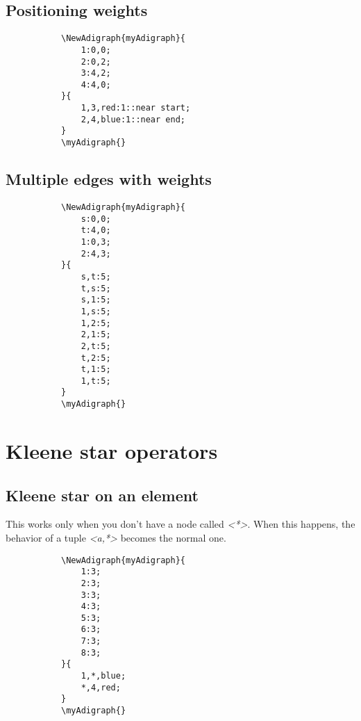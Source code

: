 \documentclass{report}
\begin{document}
\subsection{Positioning weights}
\begin{figure}
	\begin{subfigure}{0.49\textwidth}
		\begin{verbatim}
\NewAdigraph{myAdigraph}{
	1:0,0;
	2:0,2;
	3:4,2;
	4:4,0;
}{
	1,3,red:1::near start;
	2,4,blue:1::near end;
}
\myAdigraph{}
\end{verbatim}
	\end{subfigure}
	\begin{subfigure}{0.49\textwidth}
		\myAdigraph{}
	\end{subfigure}
\end{figure}


\subsection{Multiple edges with weights}
\begin{figure}
	\begin{subfigure}{0.49\textwidth}
		\begin{verbatim}
\NewAdigraph{myAdigraph}{
	s:0,0;
	t:4,0;
	1:0,3;
	2:4,3;
}{
	s,t:5;
	t,s:5;
	s,1:5;
	1,s:5;
	1,2:5;
	2,1:5;
	2,t:5;
	t,2:5;
	t,1:5;
	1,t:5;
}
\myAdigraph{}
\end{verbatim}
	\end{subfigure}
	\begin{subfigure}{0.49\textwidth}
		\myAdigraph{}
	\end{subfigure}
\end{figure}

\section{Kleene star operators}
\subsection{Kleene star on an element}
This works only when you don't have a node called \textit{<*>}. When this happens, the behavior of a tuple \textit{<a,*>} becomes the normal one.
\begin{figure}
	\begin{subfigure}{0.49\textwidth}
		\begin{verbatim}
\NewAdigraph{myAdigraph}{
	1:3;
	2:3;
	3:3;
	4:3;
	5:3;
	6:3;
	7:3;
	8:3;
}{
	1,*,blue;
	*,4,red;
}
\myAdigraph{}
\end{verbatim}
	\end{subfigure}
	\begin{subfigure}{0.49\textwidth}
		\myAdigraph{}
	\end{subfigure}
\end{figure}
\end{document}
